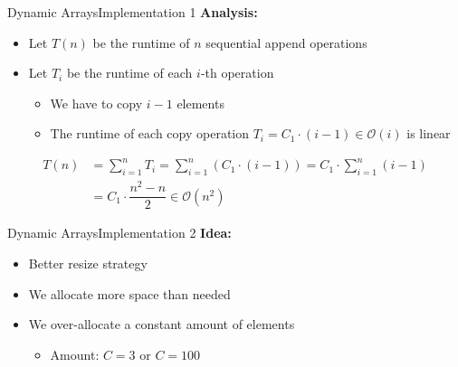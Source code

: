 
\begin{frame}{Dynamic Arrays}{Implementation 1}
  \textbf{Analysis:}
  \begin{itemize}
    \item
      Let $T(n)$ be the runtime of $n$ sequential append operations
    \item
      Let $T_i$ be the runtime of each $i$-th operation
      \begin{itemize}
        \item
          We have to copy $i-1$ elements
        \item
          The runtime of each copy operation
          $T_i = C_1 \cdot (i - 1) \in \mathcal{O}(i)$ is linear
      \end{itemize}
  \end{itemize}
  \begin{align*}
    T(n) &= \sum_{i=1}^n T_i
      = \sum_{i=1}^n \left(C_1 \cdot (i-1) \right)
      = C_1 \cdot \sum_{i=1}^n (i-1)\\
      &= C_1 \cdot \dfrac{n^2-n}{2} \in \mathcal{O}(n^2)
  \end{align*}
\end{frame}


\begin{frame}{Dynamic Arrays}{Implementation 2}
  \textbf{Idea:}
  \begin{itemize}
    \item
      Better resize strategy
    \item
      We allocate more space than needed
    \item
      We over-allocate a constant amount of elements
      \begin{itemize}
        \item
          Amount: $C = 3$ or $C = 100$
      \end{itemize}
  \end{itemize}
\end{frame}



